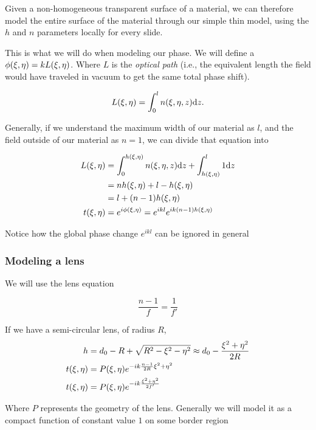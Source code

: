 \documentclass[../main/main.tex]{subfiles}
\begin{document}
Given a non-homogeneous transparent surface of a material, we can therefore model the entire surface of the material through our simple thin model, using the $h$ and $n$ parameters locally for every slide.

This is what we will do when modeling our phase. We will define a $\phi (\xi, \eta) = k L(\xi, \eta)$. Where $L$ is the \emph{optical path} (i.e., the equivalent length the field would have traveled in vacuum to get the same total phase shift).

\begin{align*}
L(\xi, \eta) = \int_{0}^{l}n(\xi, \eta, z) \dd z.
\end{align*}

Generally, if we understand the maximum width of our material as $l$, and the field outside of our material as $n=1$, we can divide that equation into


\begin{align}
L(\xi, \eta) &= \int_{0}^{h(\xi, \eta)}n(\xi, \eta, z) \dd z +  \int_{h(\xi, \eta)}^{l}1 \dd z \\
 &= n h(\xi, \eta) +  l -h(\xi, \eta) \\
 &= l + (n - 1) h(\xi, \eta)\\
 t(\xi, \eta) &= e^{i\phi(\xi, \eta)} = e^{ikl}e^{ik(n - 1) h(\xi, \eta)}
\end{align}

Notice how the global phase change $e^{ikl}$ can be ignored in general


\subsubsection{Modeling a lens}

We will use the lens equation

\begin{equation}
\frac{n-1}{f} = \frac{1}{f'}
\end{equation}

If we have a semi-circular lens, of radius $R$,
\begin{align}
h &= d_{0} - R + \sqrt{R^{2}- \xi^{2} - \eta^{2}} \approx d_{0} -\frac{\xi^{2} + \eta^{2}}{2R}  \\
t(\xi, \eta) &= P(\xi, \eta) e^{-ik \frac{n-1}{2R} \xi^{2} + \eta^{2}}\\
t(\xi, \eta) &= P(\xi, \eta) e^{-ik \frac{ \xi^{2} + \eta^{2}}{2 f '}}
\end{align}

Where $P$ represents the geometry of the lens. Generally we will model it as a compact function of constant value $1$ on some border region
\end{document}
